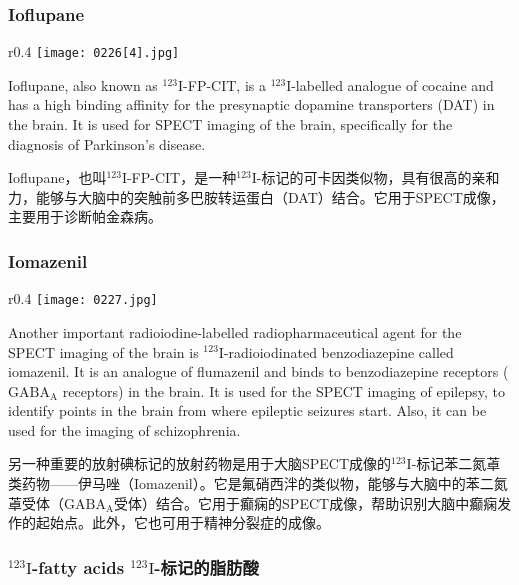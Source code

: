 \documentclass[dvipsnames, svgnames,a4paper,11pt]{article}
\begin{document}
\subsubsection{Ioflupane}  

\begin{wrapfigure}{r}{0.4\textwidth}
    \centering
    \texttt{[image: 0226[4].jpg]}
     \label{fig300}
\end{wrapfigure}

Ioflupane, also known as \(\mathrm{^{123}I}\)-FP-CIT, is a \(\mathrm{^{123}I}\)-labelled analogue of cocaine and has a high binding affinity for the presynaptic dopamine transporters (DAT) in the brain. It is used for SPECT imaging of the brain, specifically for the diagnosis of Parkinson's disease.

Ioflupane，也叫\(\mathrm{^{123}I}\)-FP-CIT，是一种\(\mathrm{^{123}I}\)-标记的可卡因类似物，具有很高的亲和力，能够与大脑中的突触前多巴胺转运蛋白（DAT）结合。它用于SPECT成像，主要用于诊断帕金森病。

\subsubsection{Iomazenil}  

\begin{wrapfigure}{r}{0.4\textwidth}
    \centering
    \texttt{[image: 0227.jpg]}
     \label{fig301}
\end{wrapfigure}

Another important radioiodine-labelled radiopharmaceutical agent for the SPECT imaging of the brain is \(\mathrm{^{123}I}\)-radioiodinated benzodiazepine called iomazenil. It is an analogue of flumazenil and binds to benzodiazepine receptors (\(\mathrm{GABA_A}\) receptors) in the brain. It is used for the SPECT imaging of epilepsy, to identify points in the brain from where epileptic seizures start. Also, it can be used for the imaging of schizophrenia.  

另一种重要的放射碘标记的放射药物是用于大脑SPECT成像的\(\mathrm{^{123}I}\)-标记苯二氮䓬类药物——伊马唑（Iomazenil）。它是氟硝西泮的类似物，能够与大脑中的苯二氮䓬受体（\(\mathrm{GABA_A}\)受体）结合。它用于癫痫的SPECT成像，帮助识别大脑中癫痫发作的起始点。此外，它也可用于精神分裂症的成像。  

\subsubsection{\(\mathrm{^{123}I}\)-fatty acids \(\mathrm{^{123}I}\)-标记的脂肪酸}  
\setcounter{figure}{301}
\end{document}

